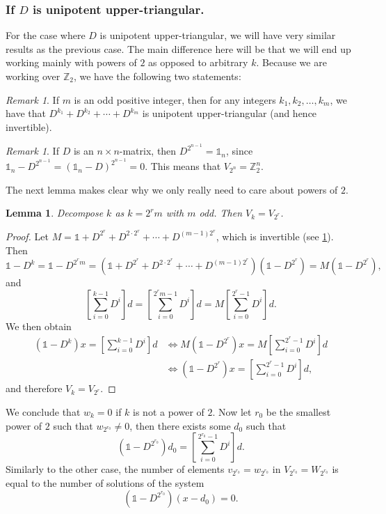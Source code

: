 \documentclass[a4paper]{article}
\theoremstyle{plain}
\newtheorem{lemma}[theorem]{Lemma}
\theoremstyle{definition}
\theoremstyle{remark}
\newtheorem{remark}[theorem]{Remark}
\newcommand{\I}{\mathds{1}}
\newcommand{\ZZ}{{\mathbb{Z}}}
\begin{document}
\subsubsection{If \(D\) is unipotent upper-triangular.}
For the case where \(D\) is unipotent upper-triangular, we will have very similar results as the previous case. The main difference here will be that we will end up working mainly with powers of \(2\) as opposed to arbitrary \(k\). Because we are working over \(\ZZ_2\), we have the following two statements:
\begin{remark}
	\label{rem:suminvertible}
	If \(m\) is an odd positive integer, then for any integers \(k_1, k_2, \dots, k_m\), we have that \(D^{k_1} + D^{k_2} + \cdots + D^{k_m}\) is unipotent upper-triangular (and hence invertible).
\end{remark}

\begin{remark}
	If \(D\) is an \(n \times n\)-matrix, then \(D^{2^{n-1}} = \I_n\), since \(\I_n - D^{2^{n-1}} = (\I_n - D)^{2^{n-1}} = 0\). This means that \(V_{2^n} = \ZZ_2^n\).
\end{remark}


The next lemma makes clear why we only really need to care about powers of \(2\).
\begin{lemma}
	Decompose \(k\) as \(k = 2^rm\) with \(m\) odd. Then \(V_k = V_{2^r}\).
\end{lemma} 
\begin{proof}
	Let \(M = \I + D^{2^r} + D^{2 \cdot 2^r} + \cdots + D^{(m-1)2^r}\), which is invertible (see \cref{rem:suminvertible}). Then 
	\begin{equation*}
	\I - D^k =  \I - D^{2^rm} = (\I + D^{2^r} + D^{2 \cdot 2^r} + \cdots + D^{(m-1)2^r})(\I - D^{2^r}) = M(\I - D^{2^r}),
	\end{equation*}
	and
	\begin{equation*}
	\left[\sum_{i=0}^{k-1}D^i \right] d = \left[\sum_{i=0}^{2^rm-1}D^i \right]d = M \left[\sum_{i=0}^{2^r-1}D^i\right] d.
	\end{equation*}
	We then obtain
	\begin{align*}
	(\I - D^k)x = \left[\sum_{i=0}^{k-1}D^i \right] d &\iff M (\I - D^{2^r})x = M \left[\sum_{i=0}^{2^r-1}D^i\right] d\\
	& \iff (\I - D^{2^r})x =  \left[\sum_{i=0}^{2^r-1}D^i\right] d,
	\end{align*}
	and therefore \(V_k = V_{2^r}\).
\end{proof}
We conclude that \(w_k = 0\) if \(k \) is not a power of \(2\). Now let  \(r_0\) be the smallest power of \(2\) such that \(w_{2^{r_0}} \neq 0\), then there exists some \(d_0\) such that 
\begin{equation*}
(\I - D^{2^{r_0}})d_0 = \left[\sum_{i=0}^{2^{r_0}-1} D^i\right] d.
\end{equation*}
Similarly to the other case, the number of elements $v_{2^{r_0}}=w_{2^{r_0}}$ in $V_{2^{r_0}}=W_{2^{r_0}}$ is equal to the number of solutions of the system
\begin{equation*}
(\I-D^{2^{r_0}})(x-d_0) = 0.
\end{equation*}
\end{document}

